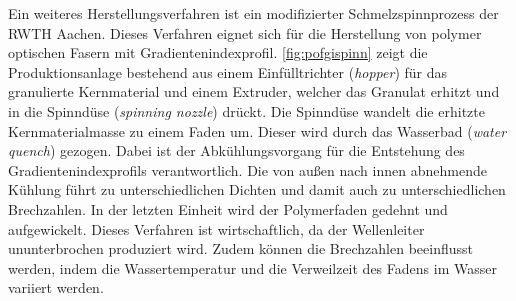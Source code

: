 Ein weiteres Herstellungsverfahren ist ein modifizierter Schmelzspinnprozess der
RWTH Aachen. Dieses Verfahren eignet sich für die Herstellung von polymer
optischen Fasern mit Gradientenindexprofil. \autoref{fig:pofgispinn} zeigt die
Produktionsanlage bestehend aus einem Einfülltrichter (\textit{hopper}) für das
granulierte Kernmaterial und einem Extruder, welcher das Granulat erhitzt und in
die Spinndüse (\textit{spinning nozzle}) drückt. Die Spinndüse wandelt die
erhitzte Kernmaterialmasse zu einem Faden um. Dieser wird durch das Wasserbad
(\textit{water quench}) gezogen. Dabei ist der Abkühlungsvorgang für die
Entstehung des Gradientenindexprofils verantwortlich. Die von außen nach innen
abnehmende Kühlung führt zu unterschiedlichen Dichten und damit auch zu
unterschiedlichen Brechzahlen. In der letzten Einheit wird der Polymerfaden
gedehnt und aufgewickelt. Dieses Verfahren ist wirtschaftlich, da der
Wellenleiter ununterbrochen produziert wird. Zudem können die Brechzahlen
beeinflusst werden, indem die Wassertemperatur und die Verweilzeit des Fadens im
Wasser variiert werden. \cite{pofspinn}


